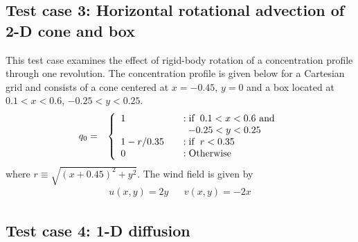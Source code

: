 \subsection{Test case 3: Horizontal rotational advection of 2-D cone and box}
This test case examines the effect of rigid-body rotation of a concentration profile
through one revolution.  The concentration profile is given below for a Cartesian grid
and consists of a cone centered at $x=-0.45$, $y=0$ and a box located at
$0.1<x<0.6$, $-0.25<y<0.25$.
\begin{eqnarray}\label{EqTC3Source}
q_0 &=& \left\{ \begin{array} {l@{\quad \quad}l}
1         &:  \mathrm{if}\,\,\, 0.1 < x < 0.6 \,\,\mathrm{and}\\
          &  \,\,\, -0.25 < y < 0.25 \\
1-r/0.35  &:  \mathrm{if}\,\,\, r < 0.35 \\
0         &: \mathrm{Otherwise}
\end{array}
\right.
\end{eqnarray}
where $r \equiv \sqrt{\left( x+0.45\right)^2+y^2}$.
The wind field is given by
\begin{eqnarray}
u(x,y)=2y & & v(x,y)=-2x \label{EqTC3Wind}
\end{eqnarray}

\clearpage
\subsection{Test case 4: 1-D diffusion}
\clearpage
